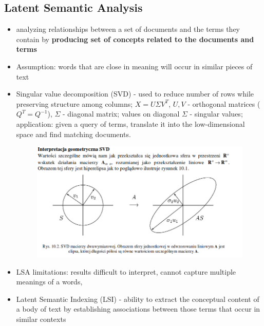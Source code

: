 \documentclass[10pt,a4paper]{article}
\begin{document}
\subsection{Latent Semantic Analysis}
  \begin{itemize}
    \item analyzing relationships between a set of documents and the terms they contain by \textbf{producing set of concepts related to the documents and terms}
    \item Assumption: words that are close in meaning will occur in similar pieces of text
    \item Singular value decomposition (SVD) - used to reduce number of rows while preserving structure among columns; $X = U \Sigma V^{T}$, $U, V$ - orthogonal matrices ($Q^{T} = Q^{-1}$), $\Sigma$ - diagonal matrix; values on diagonal $\Sigma$ - singular values; application: given a query of terms, translate it into the low-dimensional space and find matching documents.
    \begin{figure}[H]
      \centering
        \includegraphics[scale=0.50]{images/svd.png}
    \end{figure}
    \item LSA limitations: results difficult to interpret, cannot capture multiple meanings of a words,
    \item Latent Semantic Indexing (LSI) - ability to extract the conceptual content of a body of text by establishing associations between those terms that occur in similar contexts

  \end{itemize}
\end{document}
